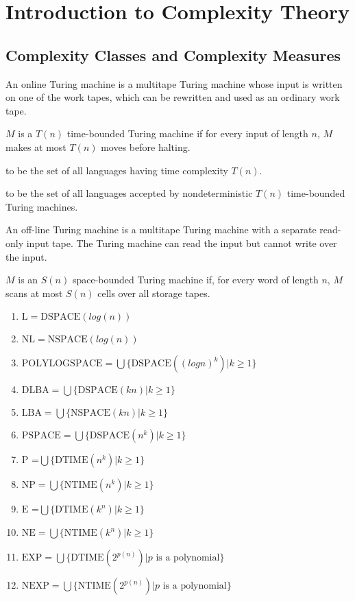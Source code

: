 \section{Introduction to Complexity Theory}

\subsection{Complexity Classes and Complexity Measures}

 An online Turing machine is a multitape Turing machine whose input is written on one
of the work tapes, which can be rewritten and used as an ordinary work tape.

 $M$ is a $T(n)$ time-bounded Turing machine if for every 
input of length $n$, $M$ makes at most $T(n)$ moves before halting. 

 to be the set of all languages having time complexity
$T(n)$.

 to be the set of all languages accepted by nondeterministic
$T(n)$ time-bounded Turing machines.

 An off-line Turing machine is a multitape Turing machine with a separate
read-only input tape. The Turing machine can read the input but cannot write over the
input.

 $M$ is an $S(n)$ space-bounded Turing machine if, for
every word of length $n$, $M$ scans at most $S(n)$ cells over all storage tapes.

\begin{enumerate}
  \item $\text{L} = \text{DSPACE}(log(n))$
  \item $\text{NL} = \text{NSPACE}(log(n))$
  \item $\text{POLYLOGSPACE} = \bigcup \{\text{DSPACE}((logn)^k) | k \ge 1\}$
  \item $\text{DLBA} = \bigcup \{\text{DSPACE}(kn) | k \ge 1\}$
  \item $\text{LBA} = \bigcup \{\text{NSPACE}(kn) | k \ge1\}$
  \item $\text{PSPACE} = \bigcup \{\text{DSPACE}(n^k) | k \ge 1\}$
  \item $\text{P =} \bigcup \{\text{DTIME}(n^k) | k \ge 1\}$
  \item $\text{NP} = \bigcup \{\text{NTIME}(n^k) | k \ge1\}$
  \item $\text{E =} \bigcup \{\text{DTIME}(k^n) | k \ge 1\}$
  \item $\text{NE} = \bigcup \{\text{NTIME}(k^n) | k \ge 1\}$
  \item $\text{EXP} = \bigcup \{\text{DTIME}(2^{p(n)}) | p \text{ is a polynomial}\}$
  \item $\text{NEXP} = \bigcup \{\text{NTIME}(2^{p(n)}) | p \text{ is a polynomial}\}$
\end{enumerate}
